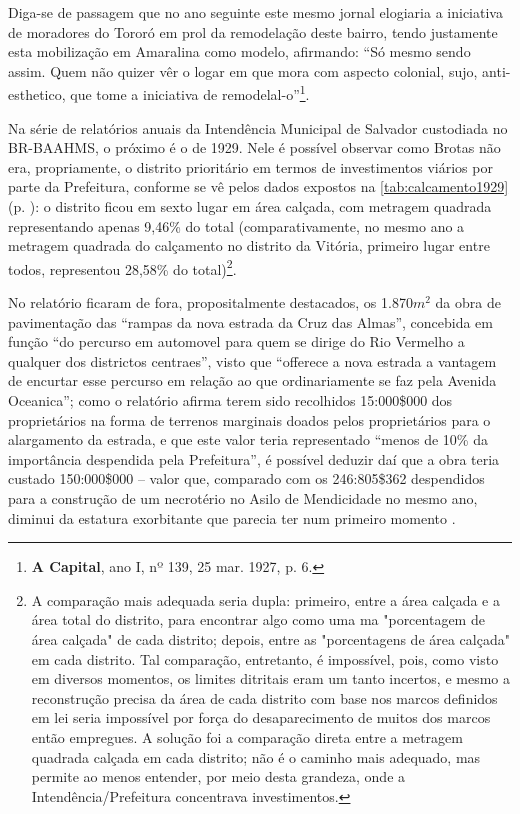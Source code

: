 Diga-se de passagem que no ano seguinte este mesmo jornal elogiaria a iniciativa de moradores do Tororó em prol da remodelação deste bairro, tendo justamente esta mobilização em Amaralina como modelo, afirmando: ``Só mesmo sendo assim. Quem não quizer vêr o logar em que mora com aspecto colonial, sujo, anti-esthetico, que tome a iniciativa de remodelal-o''\footnote{\textbf{A Capital}, ano I, nº 139, 25 mar. 1927, p. 6.}.

Na série de relatórios anuais da Intendência Municipal de Salvador custodiada no BR-BAAHMS, o próximo é o de 1929. Nele é possível observar como Brotas não era, propriamente, o distrito prioritário em termos de investimentos viários por parte da Prefeitura, conforme se vê pelos dados expostos na \autoref{tab:calcamento1929} (p. \pageref{tab:calcamento1929}): o distrito ficou em sexto lugar em área calçada, com metragem quadrada representando apenas 9,46\% do total (comparativamente, no mesmo ano a metragem quadrada do calçamento no distrito da Vitória, primeiro lugar entre todos, representou 28,58\% do total)\footnote{A comparação mais adequada seria dupla: primeiro, entre a área calçada e a área total do distrito, para encontrar algo como uma ma "porcentagem de área calçada" de cada distrito; depois, entre as "porcentagens de área calçada" em cada distrito. Tal comparação, entretanto, é impossível, pois, como visto em diversos momentos, os limites ditritais eram um tanto incertos, e mesmo a reconstrução precisa da área de cada distrito com base nos marcos definidos em lei seria impossível por força do desaparecimento de muitos dos marcos então empregues. A solução foi a comparação direta entre a metragem quadrada calçada em cada distrito; não é o caminho mais adequado, mas permite ao menos entender, por meio desta grandeza, onde a Intendência/Prefeitura concentrava investimentos.}.



No relatório ficaram de fora, propositalmente destacados, os 1.870$m^{2}$ da obra de pavimentação das “rampas da nova estrada da Cruz das Almas”, concebida em função “do percurso em automovel para quem se dirige do Rio Vermelho a qualquer dos districtos centraes”, visto que “offerece a nova estrada a vantagem de encurtar esse percurso em relação ao que ordinariamente se faz pela Avenida Oceanica”; como o relatório afirma terem sido recolhidos 15:000\$000 dos proprietários na forma de terrenos marginais doados pelos proprietários para o alargamento da estrada, e que este valor teria representado “menos de 10\% da importância despendida pela Prefeitura”, é possível deduzir daí que a obra teria custado 150:000\$000 – valor que, comparado com os 246:805\$362 despendidos para a construção de um necrotério no Asilo de Mendicidade no mesmo ano, diminui da estatura exorbitante que parecia ter num primeiro momento \cite[pp.~22-23]{salvador_relatorio_1929}.

